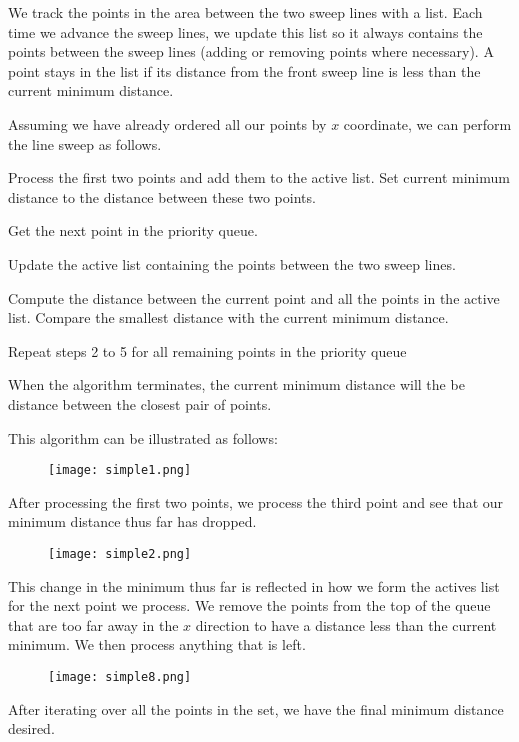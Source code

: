 We track the points in the area between the two sweep lines with a list.  Each time we advance
the sweep lines, we update this list so it always contains the points between the sweep lines (adding or removing points where necessary).
A point stays in the list if its distance from the front sweep line is less than the current minimum distance.

Assuming we have already ordered all our points by $x$ coordinate, we can perform the line sweep as follows.
\begin{remunerate}
\item Process the first two points and add them to the active list.
Set current minimum distance to the distance between these two points.
\item Get the next point in the priority queue.
\item Update the active list containing the points between the two sweep lines.
\item Compute the distance between the current point and all the points in the active list.
Compare the smallest distance with the current minimum distance.
\item Repeat steps 2 to 5 for all remaining points in the priority queue
\end{remunerate}
When the algorithm terminates, the current minimum distance will the be distance between the closest pair of points.

This algorithm can be illustrated as follows:
\begin{figure}
\texttt{[image: simple1.png]}
\end{figure}
After processing the first two points, we process the third point and see that our minimum distance thus far has dropped.

\begin{figure}
\texttt{[image: simple2.png]}
\end{figure}
This change in the minimum thus far is reflected in how we form the actives list for the next point we process. 
We remove the points from the top of the queue that are too far away in the $x$ direction to have a distance less than the current minimum. 
We then process anything that is left.

\begin{figure}
\texttt{[image: simple8.png]}
\end{figure}
After iterating over all the points in the set, we have the final minimum distance desired.

